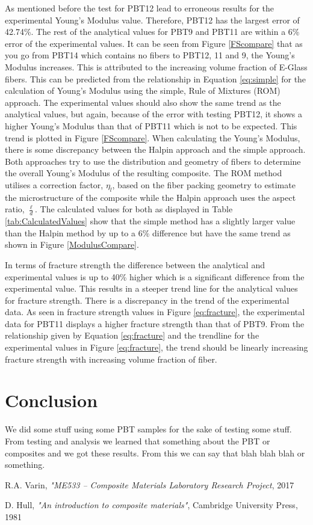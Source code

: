 \documentclass[11pt]{article}
\begin{document}
As mentioned before the test for PBT12 lead to erroneous results for the experimental Young's Modulus value. Therefore, PBT12 has the largest error of 42.74\%. The rest of the analytical values for PBT9 and PBT11 are within a 6\% error of the experimental values. It can be seen from Figure \ref{FScompare} that as you go from PBT14 which contains no fibers to PBT12, 11 and  9, the Young's Modulus increases. This is attributed to the increasing volume fraction of E-Glass fibers. This can be predicted from the relationship in Equation \ref{eq:simple} for the calculation of Young's Modulus using the simple, Rule of Mixtures (ROM) approach. The experimental values should also show the same trend as the analytical values, but again, because of the error with testing PBT12, it shows a higher Young's Modulus than that of PBT11 which is not to be expected. This trend is plotted in Figure \ref{FScompare}.
\singlespacing
When calculating the Young's Modulus, there is some discrepancy between the Halpin approach and the simple approach. Both approaches try to use the distribution and geometry of fibers to determine the overall Young's Modulus of the resulting composite. The ROM method utilises a correction factor, \(\eta_l\), based on the fiber packing geometry to estimate the microstructure of the composite while the Halpin approach uses the aspect ratio, \(\frac{\ell}{d}\). The calculated values for both as displayed in Table \ref{tab:CalculatedValues} show that the simple method has a slightly larger value than the Halpin method by up to a 6\% difference but have the same trend as shown in Figure \ref{ModulusCompare}.
\singlespacing

In terms of fracture strength the difference between the analytical and experimental values is up to 40\% higher which is a significant difference from the experimental value. This results in a steeper trend line for the analytical values for fracture strength. There is a discrepancy in the trend of the experimental data. As seen in fracture strength values in Figure \ref{eq:fracture}, the experimental data for PBT11 displays a higher fracture strength than that of PBT9. From the relationship given by Equation \ref{eq:fracture} and the trendline for the experimental values in Figure \ref{eq:fracture}, the trend should be linearly increasing fracture strength with increasing volume fraction of fiber.


\section{Conclusion}


We did some stuff using some PBT samples for the sake of testing some stuff. From testing and analysis we learned that something about the PBT or composites and we got these results. From this we can say that blah blah blah or something. 

\newpage
\begin{thebibliography}{9}
R.A. Varin, \textit{"ME533 -- Composite Materials Laboratory Research Project}, 2017

D. Hull, \textit{"An introduction to composite materials"}, Cambridge University Press, 1981

\end{thebibliography}
\end{document}
